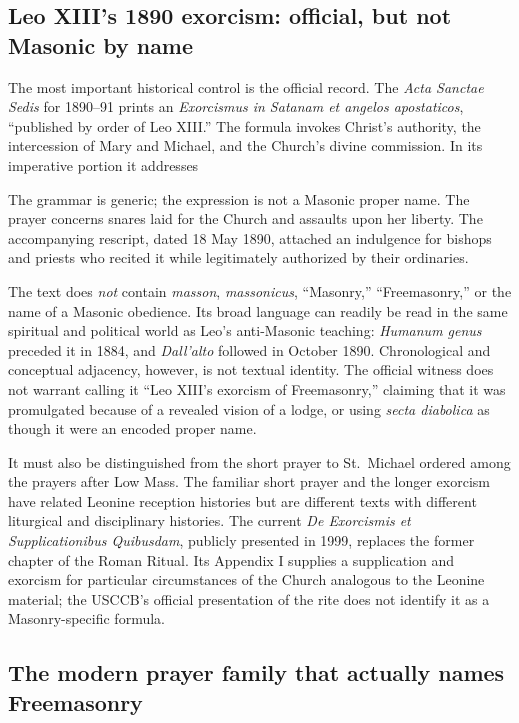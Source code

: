\subsection{Leo XIII's 1890 exorcism: official, but not Masonic by name}

The most important historical control is the official record.  The \emph{Acta Sanctae Sedis} for 1890--91 prints an \emph{Exorcismus in Satanam et angelos apostaticos}, ``published by order of Leo XIII.''  The formula invokes Christ's authority, the intercession of Mary and Michael, and the Church's divine commission.  In its imperative portion it addresses

\begin{quote}
\end{quote}

The grammar is generic; the expression is not a Masonic proper name.  The prayer concerns snares laid for the Church and assaults upon her liberty.  The accompanying rescript, dated 18 May 1890, attached an indulgence for bishops and priests who recited it while legitimately authorized by their ordinaries.

The text does \emph{not} contain \emph{masson}, \emph{massonicus}, ``Masonry,'' ``Freemasonry,'' or the name of a Masonic obedience.  Its broad language can readily be read in the same spiritual and political world as Leo's anti-Masonic teaching: \emph{Humanum genus} preceded it in 1884, and \emph{Dall'alto} followed in October 1890.  Chronological and conceptual adjacency, however, is not textual identity.  The official witness does not warrant calling it ``Leo XIII's exorcism of Freemasonry,'' claiming that it was promulgated because of a revealed vision of a lodge, or using \emph{secta diabolica} as though it were an encoded proper name.

It must also be distinguished from the short prayer to St.~Michael ordered among the prayers after Low Mass.  The familiar short prayer and the longer exorcism have related Leonine reception histories but are different texts with different liturgical and disciplinary histories.  The current \emph{De Exorcismis et Supplicationibus Quibusdam}, publicly presented in 1999, replaces the former chapter of the Roman Ritual.  Its Appendix I supplies a supplication and exorcism for particular circumstances of the Church analogous to the Leonine material; the USCCB's official presentation of the rite does not identify it as a Masonry-specific formula.

\subsection{The modern prayer family that actually names Freemasonry}

